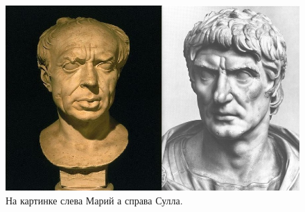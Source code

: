 \begin{figure}[h!tb] 
	\centering\includegraphics[scale=0.6]{SullaMariy/1595005110125645377.png}
	\caption{На картинке  слева Марий а справа Сулла.}%
\end{figure}